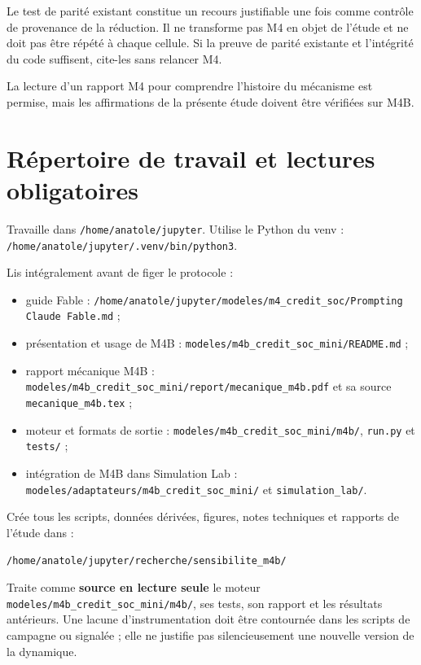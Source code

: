 \documentclass[11pt,a4paper]{article}
\newcommand{\code}[1]{\texttt{\color{navy}#1}}
\newcommand{\file}[1]{\nolinkurl{#1}}
\newcommand{\term}[1]{\textbf{\color{navy}#1}}
\begin{document}
Le test de parité existant constitue un recours justifiable une fois comme
contrôle de provenance de la réduction. Il ne transforme pas M4 en objet de
l'étude et ne doit pas être répété à chaque cellule. Si la preuve de parité
existante et l'intégrité du code suffisent, cite-les sans relancer M4.

La lecture d'un rapport M4 pour comprendre l'histoire du mécanisme est permise,
mais les affirmations de la présente étude doivent être vérifiées sur M4B.

\section{Répertoire de travail et lectures obligatoires}

Travaille dans \file{/home/anatole/jupyter}. Utilise le Python du venv :
\file{/home/anatole/jupyter/.venv/bin/python3}.

Lis intégralement avant de figer le protocole :

\begin{itemize}
  \item guide Fable :
    \file{/home/anatole/jupyter/modeles/m4_credit_soc/Prompting Claude Fable.md} ;
  \item présentation et usage de M4B :
    \file{modeles/m4b_credit_soc_mini/README.md} ;
  \item rapport mécanique M4B :
    \file{modeles/m4b_credit_soc_mini/report/mecanique_m4b.pdf} et sa source
    \code{mecanique\_m4b.tex} ;
  \item moteur et formats de sortie : \file{modeles/m4b_credit_soc_mini/m4b/},
    \file{run.py} et \file{tests/} ;
  \item intégration de M4B dans Simulation Lab :
    \file{modeles/adaptateurs/m4b_credit_soc_mini/} et
    \file{simulation_lab/}.
\end{itemize}

Crée tous les scripts, données dérivées, figures, notes techniques et rapports
de l'étude dans :

\begin{center}
  \file{/home/anatole/jupyter/recherche/sensibilite_m4b/}
\end{center}

Traite comme \term{source en lecture seule} le moteur
\file{modeles/m4b_credit_soc_mini/m4b/}, ses tests, son rapport et les résultats
antérieurs. Une lacune d'instrumentation doit être contournée dans les scripts
de campagne ou signalée ; elle ne justifie pas silencieusement une nouvelle
version de la dynamique.
\end{document}
